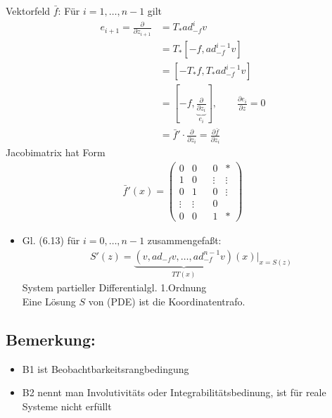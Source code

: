 \documentclass[ngerman]{tudscrreprt}
\begin{document}
Vektorfeld $\bar f$: Für $i = 1, \dots, n-1$ gilt \begin{align*}
e_{i+1} = \frac{\partial }{\partial z_{i+1}} &= T_{*}ad_{-f}^i v \\ 
& = T_{*} [-f, ad_{-f}^{i-1} v]\\ 
&= [-T_{*} f, T_{*} ad_{-f}^{i-1} v]\\ 
&= [-f, \underbrace{\frac{\partial}{\partial z_{i}}}_{e_i}], \qquad \frac{\partial e_i}{\partial z} = 0\\ 
&= \bar f'\cdot \frac{\partial }{\partial z_i} = \frac{\partial \bar f}{\partial z_i} \tag{6.15}
\end{align*}
Jacobimatrix hat Form
\begin{align*}
\bar f'(x) = \begin{pmatrix}
0 & 0 & &0& *\\ 
1 & 0 && \vdots&\vdots\\ 
0 & 1 && 0 &\vdots\\ 
\vdots&\vdots& & 0&\\ 
0&0 && 1 &*
\end{pmatrix}
\tag{6.16}
\end{align*}
\begin{itemize}
\item Gl. (6.13) für $i = 0, \dots, n-1$ zusammengefaßt: \begin{align*}
S'(z) = \underbrace{(v, ad_{-f} v, \dots, ad_{-f}^{n-1} v) }_{TT(x)}(x)|_{x = S(z)}
\end{align*}
System partieller Differentialgl. 1.Ordnung\\ 
Eine Lösung $S$ von (PDE) ist die Koordinatentrafo. 
\end{itemize}
\subsection*{Bemerkung:}
\begin{itemize}
\item B1 ist Beobachtbarkeitsrangbedingung
\item B2 nennt man Involutivitäts oder Integrabilitätsbedinung, ist für reale Systeme nicht erfüllt
\end{itemize}
\end{document}
